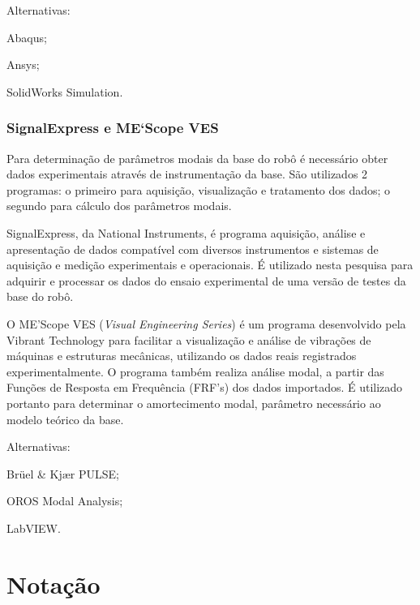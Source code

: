 Alternativas:
%
\begin{enumerate*}
	\item Abaqus;
	\item Ansys;
	\item SolidWorks Simulation.
\end{enumerate*}


\subsubsection{SignalExpress e ME`Scope VES}

Para determinação de parâmetros modais da base do robô é necessário obter dados
experimentais através de instrumentação da base. São utilizados 2 programas: o
primeiro para aquisição, visualização e tratamento dos dados; o segundo para
cálculo dos parâmetros modais.

SignalExpress\cite{signalexpress}, da National Instruments, é programa
aquisição, análise e apresentação de dados compatível com diversos instrumentos e sistemas de
aquisição e medição experimentais e operacionais. 
É utilizado nesta pesquisa para adquirir e processar os dados do ensaio
experimental de uma versão de testes da base do robô.

O ME'Scope VES (\textit{Visual Engineering Series})\cite{mescope} é um programa
desenvolvido pela Vibrant Technology para facilitar a visualização e análise de
vibrações de máquinas e estruturas mecânicas, utilizando os dados reais
registrados experimentalmente. O programa também realiza análise modal, a partir
das Funções de Resposta em Frequência (FRF's) dos dados importados. É utilizado
portanto para  determinar o amortecimento modal, parâmetro necessário ao modelo
teórico da base.

Alternativas:
%
\begin{enumerate*}
	\item Brüel \& Kjær PULSE;
	\item OROS Modal Analysis;
	\item LabVIEW.
\end{enumerate*}

\section{Notação}

